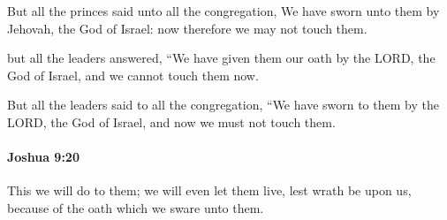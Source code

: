 			\begin{versebox}
					\item[BHS] 
					\item[ASV] But all the princes said unto all the congregation, We have sworn unto them by Jehovah, the God of Israel: now therefore we may not touch them.
					\item[NIV] but all the leaders answered, “We have given them our oath by the LORD, the God of Israel, and we cannot touch them now.
					\item[NRSV] But all the leaders said to all the congregation, “We have sworn to them by the LORD, the God of Israel, and now we must not touch them.
			\end{versebox}

		\paragraph{Joshua 9:20} %
			\label{JOSHUA-9-20}

			This we will do to them; we will even let them live, lest wrath be upon us, because of the oath which we sware unto them.

